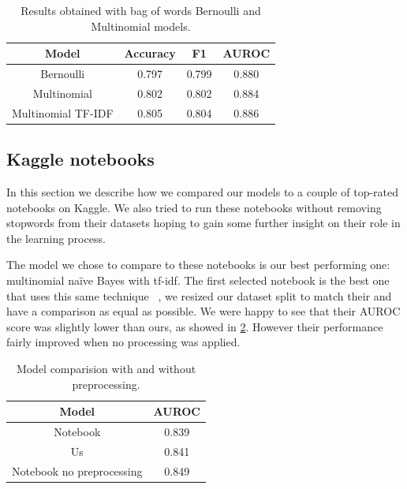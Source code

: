 \begin{table}[h!t]
    \centering
    \caption{Results obtained with bag of words Bernoulli and Multinomial models.}
    \label{tab:classic_nb_vs_embeddings}
    \begin{tabular}{c|ccc}
        \hline
        Model & Accuracy & F1 & AUROC \\
        \hline 
        Bernoulli & 0.797 & 0.799 & 0.880 \\ 
        Multinomial & 0.802 & 0.802 & 0.884 \\ 
        Multinomial TF-IDF & 0.805 & 0.804 & 0.886 \\ 
        \hline
    \end{tabular}
\end{table}

\subsection*{Kaggle notebooks}

In this section we describe how we compared our models to a couple of top-rated notebooks on Kaggle.
We also tried to run these notebooks without removing stopwords from their datasets hoping to gain some further insight on their role in the learning process. 

The model we chose to compare to these notebooks is our best performing one: multinomial na\"ive Bayes with tf-idf. 
The first selected notebook is the best one that uses this same technique ~\cite{startups:notebook1}, we resized our dataset split to match their and have a comparison as equal as possible.
We were happy to see that their AUROC score was slightly lower than ours, as showed in \ref{tab:versus_metrics_NB}.
However their performance fairly improved when no processing was applied.

\begin{table}[h!t]
    \centering
    \caption{Model comparision with and without preprocessing.}
    \label{tab:versus_metrics_NB}
    \begin{tabular}{c|c}
        \hline
        Model & AUROC \\
        \hline 
        Notebook & 0.839 \\ 
        Us & 0.841 \\ 
        Notebook no preprocessing & 0.849 \\ 
        \hline
    \end{tabular}
\end{table}

